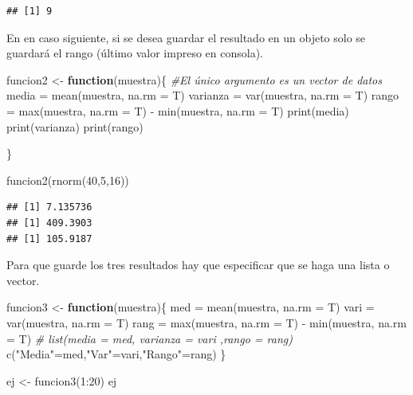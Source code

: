 \documentclass[
]{book}
\newenvironment{Shaded}{\begin{snugshade}}{\end{snugshade}}
\newcommand{\AttributeTok}[1]{\textcolor[rgb]{0.77,0.63,0.00}{#1}}
\newcommand{\CommentTok}[1]{\textcolor[rgb]{0.56,0.35,0.01}{\textit{#1}}}
\newcommand{\ControlFlowTok}[1]{\textcolor[rgb]{0.13,0.29,0.53}{\textbf{#1}}}
\newcommand{\DecValTok}[1]{\textcolor[rgb]{0.00,0.00,0.81}{#1}}
\newcommand{\FunctionTok}[1]{\textcolor[rgb]{0.00,0.00,0.00}{#1}}
\newcommand{\NormalTok}[1]{#1}
\newcommand{\OtherTok}[1]{\textcolor[rgb]{0.56,0.35,0.01}{#1}}
\newcommand{\SpecialCharTok}[1]{\textcolor[rgb]{0.00,0.00,0.00}{#1}}
\newcommand{\StringTok}[1]{\textcolor[rgb]{0.31,0.60,0.02}{#1}}
\begin{document}
\begin{verbatim}
## [1] 9
\end{verbatim}

En en caso siguiente, si se desea guardar el resultado en un objeto solo se guardará el rango (último valor impreso en consola).

\begin{Shaded}
\begin{Highlighting}[]
\NormalTok{funcion2 }\OtherTok{\textless{}{-}} \ControlFlowTok{function}\NormalTok{(muestra)\{     }\CommentTok{\#El único argumento es un vector de datos}
\NormalTok{  media }\OtherTok{=} \FunctionTok{mean}\NormalTok{(muestra, }\AttributeTok{na.rm =}\NormalTok{ T)}
\NormalTok{  varianza }\OtherTok{=} \FunctionTok{var}\NormalTok{(muestra, }\AttributeTok{na.rm =}\NormalTok{ T)}
\NormalTok{  rango }\OtherTok{=} \FunctionTok{max}\NormalTok{(muestra, }\AttributeTok{na.rm =}\NormalTok{ T) }\SpecialCharTok{{-}} \FunctionTok{min}\NormalTok{(muestra, }\AttributeTok{na.rm =}\NormalTok{ T)}
  \FunctionTok{print}\NormalTok{(media)}
  \FunctionTok{print}\NormalTok{(varianza)}
  \FunctionTok{print}\NormalTok{(rango)}

\NormalTok{\}}

\FunctionTok{funcion2}\NormalTok{(}\FunctionTok{rnorm}\NormalTok{(}\DecValTok{40}\NormalTok{,}\DecValTok{5}\NormalTok{,}\DecValTok{16}\NormalTok{))}
\end{Highlighting}
\end{Shaded}

\begin{verbatim}
## [1] 7.135736
## [1] 409.3903
## [1] 105.9187
\end{verbatim}

Para que guarde los tres resultados hay que especificar que se haga una lista o vector.

\begin{Shaded}
\begin{Highlighting}[]
\NormalTok{funcion3 }\OtherTok{\textless{}{-}} \ControlFlowTok{function}\NormalTok{(muestra)\{     }
\NormalTok{  med }\OtherTok{=} \FunctionTok{mean}\NormalTok{(muestra, }\AttributeTok{na.rm =}\NormalTok{ T)}
\NormalTok{  vari }\OtherTok{=} \FunctionTok{var}\NormalTok{(muestra, }\AttributeTok{na.rm =}\NormalTok{ T)}
\NormalTok{  rang }\OtherTok{=} \FunctionTok{max}\NormalTok{(muestra, }\AttributeTok{na.rm =}\NormalTok{ T) }\SpecialCharTok{{-}} \FunctionTok{min}\NormalTok{(muestra, }\AttributeTok{na.rm =}\NormalTok{ T)}
  \CommentTok{\# list(media = med, varianza = vari ,rango = rang)}
  \FunctionTok{c}\NormalTok{(}\StringTok{"Media"}\OtherTok{=}\NormalTok{med,}\StringTok{"Var"}\OtherTok{=}\NormalTok{vari,}\StringTok{"Rango"}\OtherTok{=}\NormalTok{rang)}
\NormalTok{\}}

\NormalTok{ej }\OtherTok{\textless{}{-}} \FunctionTok{funcion3}\NormalTok{(}\DecValTok{1}\SpecialCharTok{:}\DecValTok{20}\NormalTok{)}
\NormalTok{ej}
\end{Highlighting}
\end{Shaded}
\end{document}
